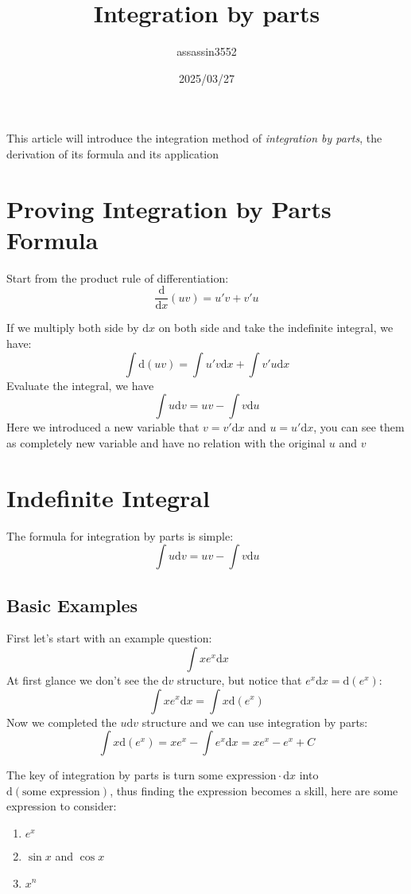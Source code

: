 \documentclass{article}
\title{Integration by parts}
\author{assassin3552}
\date{2025/03/27}
\numberwithin{equation}{section}
\begin{document}
\maketitle
This article will introduce the integration method of \emph{integration by parts}, the derivation of its formula and its application
\section{Proving Integration by Parts Formula}
Start from the product rule of differentiation:
\[
\frac{\mathrm{d}}{\mathrm{d}x} (uv) = u'v + v'u
\]

If we multiply both side by $\mathrm{d}x$ on both side and take the indefinite integral, we have:
\[
\int \mathrm{d}(uv) = \int u'v \mathrm{d}x + \int v'u \mathrm{d}x
\]
Evaluate the integral, we have 
\[
\int u \mathrm{d}v = uv - \int v\mathrm{d}u
\]
Here we introduced a new variable that $v = v'\mathrm{d}x$ and $u = u'\mathrm{d}x$, you can see them as completely new variable and have no relation with the original $u$ and $v$

\newpage
\section{Indefinite Integral}
The formula for integration by parts is simple:
\[
\int u \mathrm{d}v = uv - \int v \mathrm{d}u
\]

\subsection{Basic Examples}
First let's start with an example question:
\[
\int x e^x \mathrm{d}x
\]
At first glance we don't see the $\mathrm{d}v$ structure, but notice that $e^x \mathrm{d}x = \mathrm{d}(e^x)$:
\[
\int x e^x \mathrm{d}x = \int x \mathrm{d}(e^x)
\]
Now we completed the $u\mathrm{d}v$ structure and we can use integration by parts:
\[
    \int x \mathrm{d}(e^x) = x e^x - \int e^x \mathrm{d}x = x e^x - e^x + C
\]

The key of integration by parts is turn $\text{some expression}\cdot \mathrm{d}x$ into $\mathrm{d}(\text{some expression})$, 
thus finding the expression becomes a skill, here are some expression to consider:
\begin{enumerate}
    \item $e^x$
    \item $\sin x$ and $\cos x$
    \item $x^n$
\end{enumerate}
\end{document}
